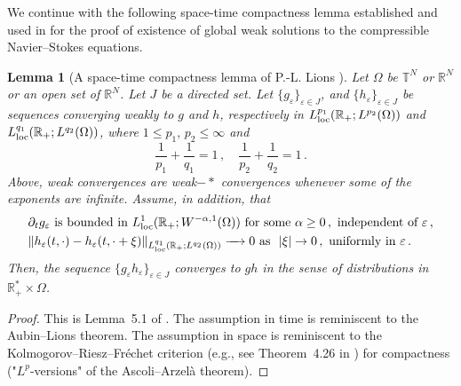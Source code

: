 \documentclass[11pt,reqno]{amsart}
\newtheorem{lemma}{Lemma}
\def \R{{\mathbb{R}}}
\def \T{{\mathbb{T}}}
\begin{document}
We continue with the following space-time compactness lemma established and used in \cite{Lio98}
for the proof of existence of global weak solutions to the compressible Navier--Stokes equations.  
\begin{lemma}[A space-time compactness lemma of P.-L. Lions \cite{Lio98}]
  \label{lem:compactness} Let $\Omega$ be $\T^N$ or $\R^N$ or an open set of  $\R^N$. Let $ J $ be a directed set.
  Let $\{g_\varepsilon\}_{\varepsilon \in J}$, and  $\{h_\varepsilon \}_{\varepsilon \in J}$ be sequences converging weakly to $g$ and $h$, respectively in $L_{\rm loc}^{p_1}(\R_+; L^{p_2}(\Omega))$
  and  $L_{\rm loc}^{q_1}(\R_+; L^{q_2}(\Omega))$, where $1\leq p_1,\, p_2 \leq \infty$ and
  \[
  \frac{1}{p_1} +  \frac{1}{q_1} = 1\,, \quad  \frac{1}{p_2} +  \frac{1}{q_2} = 1\,.
  \]
  Above, weak convergences are weak$-*$ convergences whenever some of the exponents are infinite. 
  Assume, in addition, that
  \begin{align*}
    &\partial_t g_\varepsilon  \mbox{ is bounded in } L_{\rm loc}^1(\R_+; W^{-\alpha,1}(\Omega))  \mbox{ for some } \alpha\geq 0\,, \mbox{ independent of } \varepsilon \,, \\
    & \|h_\varepsilon (t,\cdot) -h_\varepsilon(t,\cdot+ \xi)\|_{L_{\rm loc}^{q_1}(\R_+; L^{q_2}(\Omega))} \xrightarrow{\quad} 0 \ \mbox{as } \ |\xi| \rightarrow 0\,, \mbox{ uniformly in } \varepsilon \,.
  \end{align*}
  Then, the sequence $\{g_\varepsilon h_\varepsilon \}_{\varepsilon\in J}$ converges to $gh$ in the sense of distributions in $\R_+^* \times \Omega$.
\end{lemma}
\begin{proof}  
  This is Lemma~5.1 of \cite{Lio98}. The assumption in time is reminiscent to the Aubin--Lions
  theorem. The assumption in space is reminiscent to the Kolmogorov--Riesz--Fr\'echet criterion
  (e.g., see Theorem~4.26 in \cite{Bre11}) for compactness ("$L^p$-versions" of the Ascoli--Arzel\`a theorem).
\end{proof}
\end{document}
